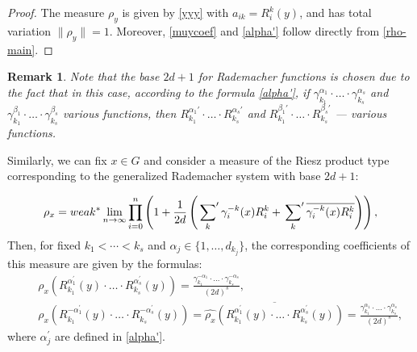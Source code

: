 \documentclass[12pt]{article}
\newtheorem{remark}{Remark}
\begin{document}
	\begin{proof}
The measure $\rho_y$ is given by \eqref{yyy} with $a_{ik} = R_i^k(y)$, and has total variation $\|\rho_y\| = 1$. Moreover, \eqref{muycoef} and \eqref{alpha'} follow directly from \eqref{rho-main}.
	\end{proof}
	\begin{remark} \label{remark-1}
		Note that the base $2d+1$ for Rademacher functions is chosen due to the fact that in this case, according to the formula \eqref{alpha'}, if $\gamma_{k_1}^{\alpha_1}\cdot\ldots\cdot \gamma_{k_s}^{\alpha_s}$ and $\gamma_{k_1}^{\beta_1} \cdot\ldots \cdot \gamma_{k_s}^{\beta_s}$ various functions, then $R_{k_1}^{\alpha_1'} \cdot\ldots\cdot R_{k_s}^{\alpha_s'}$ and $R_{k_1}^{\beta_1'} \cdot\ldots \cdot R_{k_s}^{\beta_s'}$ --- various functions.
	\end{remark}
	
	
	
	Similarly, we can fix $x\in G$ and consider a measure of the Riesz product type corresponding to the generalized Rademacher system with base $2d + 1$:
	
	\begin{equation} \label{rho_x}
		\rho_x =  weak^*\lim_{n \rightarrow\infty} \prod_{i=0}^{n} \left( 1 + \frac{1}{2d}\left( \sideset{}{'}{\sum}_{k} \gamma_i^{-k}(x) R_i^{k}  + \sideset{}{'}{\sum}_{k} \overline{\gamma_i^{-k}(x) R_i^{k}}\right) \right),
	\end{equation}
Then, for fixed $k_1 < \cdots < k_s$ and $\alpha_j \in \{1, \dots, d_{k_j}\}$, the corresponding coefficients of this measure are given by the formulas:
	\begin{equation} \label{rhox} 
		\begin{split}
			& \quad \widehat{\rho_x}(R_{k_1}^{\alpha_1^{\prime}}(y) \cdot \ldots \cdot R_{k_s}^{\alpha_s^{\prime}}(y)) = \frac{\gamma_{k_1}^{-\alpha_1} \cdot \ldots \cdot \gamma_{k_s}^{-\alpha_s}}{(2d)^{s}}, \\
			& \quad \widehat{\rho_x}(R_{k_1}^{-\alpha_1^{\prime}}(y) \cdot \ldots \cdot R_{k_s}^{-\alpha_s^{\prime}}(y)) = \overline{\widehat{\rho_x}(R_{k_1}^{\alpha_1^{\prime}}(y) \cdot \ldots \cdot R_{k_s}^{\alpha_s^{\prime}}(y))} = \frac{\gamma_{k_1}^{\alpha_1} \cdot \ldots \cdot \gamma_{k_s}^{\alpha_s}}{(2d)^{s}}, 
		\end{split} 
	\end{equation}
	where $\alpha_j^{\prime}$ are defined in \eqref{alpha'}.
\end{document}

